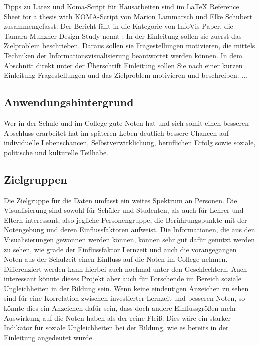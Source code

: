 \documentclass[usegeometry=true]{scrartcl}
\begin{document}
Tipps zu Latex und Koma-Script für Hausarbeiten sind im \href{http://mirrors.ctan.org/info/latex-refsheet/LaTeX_RefSheet.pdf}{LaTeX Reference Sheet for a thesis with KOMA-Script} von Marion Lammarsch und Elke Schubert zusammengefasst. 
Der Bericht fällt in die Kategorie von InfoVis-Paper, die Tamara Munzner Design Study nennt \cite{Munzner2008}: In der Einleitung sollen sie zuerst das Zielproblem beschrieben. Daraus sollen sie Fragestellungen motivieren, die mittels Techniken der Informationsvisualisierung beantwortet werden können. In dem Abschnitt direkt unter der Überschrift Einleitung sollen Sie nach einer kurzen Einleitung Fragestellungen und das Zielproblem motivieren und beschreiben. ...

\subsection{Anwendungshintergrund}
Wer in der Schule und im College gute Noten hat und sich somit einen besseren Abschluss erarbeitet hat im späteren Leben deutlich bessere Chancen auf \glqq individuelle Lebenschancen, Selbstverwirklichung, beruflichen Erfolg sowie soziale, politische und kulturelle Teilhabe. \grqq





\subsection{Zielgruppen}
Die Zielgruppe für die Daten umfasst ein weites Spektrum an Personen. Die Visualisierung sind sowohl für Schüler und Studenten, als auch für Lehrer und Eltern interessant, also jegliche Personengruppe, die Berührungspunkte mit der Notengebung und deren Einflussfaktoren aufweist.
Die Informationen, die aus den Visualisierungen gewonnen werden können, können sehr gut dafür genutzt werden zu sehen, wie grade der Einflussfaktor Lernzeit und auch die vorangegangen Noten aus der Schulzeit einen Einfluss auf die Noten im College nehmen. Differenziert werden kann hierbei auch nochmal unter den Geschlechtern. 
Auch interessant könnte dieses Projekt aber auch für Forschende im Bereich soziale Ungleichheiten in der Bildung sein. Wenn keine eindeutigen Anzeichen zu sehen sind für eine Korrelation zwischen investierter Lernzeit und besseren Noten, so könnte dies ein Anzeichen dafür sein, dass doch andere Einflussgrößen mehr Auswirkung auf die Noten haben als der reine Fleiß. Dies wäre ein starker Indikator für soziale Ungleichheiten bei der Bildung, wie es bereits in der Einleitung angedeutet wurde. 
\end{document}
